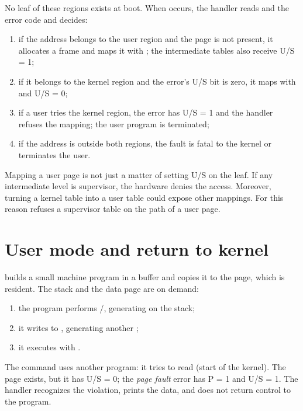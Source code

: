 No leaf of these regions exists at boot. When  occurs,
the handler reads  and the error code and decides:

\begin{enumerate}
  \item if the address belongs to the user region and the page is not
        present, it allocates a frame and maps it with
        ; the intermediate tables also receive U/S = 1;
  \item if it belongs to the kernel region and the error's U/S bit is zero,
        it maps with  and U/S = 0;
  \item if a user tries the kernel region, the error has U/S = 1 and the
        handler refuses the mapping; the user program is terminated;
  \item if the address is outside both regions, the fault is fatal
        to the kernel or terminates the user.
\end{enumerate}

\begin{nota}
Mapping a user page is not just a matter of setting U/S on the leaf.
If any intermediate level is supervisor, the hardware denies the access.
Moreover, turning a kernel table into a user table could expose other mappings.
For this reason  refuses a supervisor table on the path of a
user page.
\end{nota}

\section{User mode and return to kernel}

 builds a small machine program in a buffer and copies it
to the  page, which is resident. The stack and the data
page are on demand:

\begin{enumerate}
  \item the program performs /, generating  on the stack;
  \item it writes to , generating another ;
  \item it executes  with .
\end{enumerate}

The  command uses another program: it tries to read
 (start of the kernel). The page exists, but it has
U/S = 0; the \emph{page fault} error has P = 1 and U/S = 1. The handler
recognizes the violation, prints the data, and does not return control to the
program.

